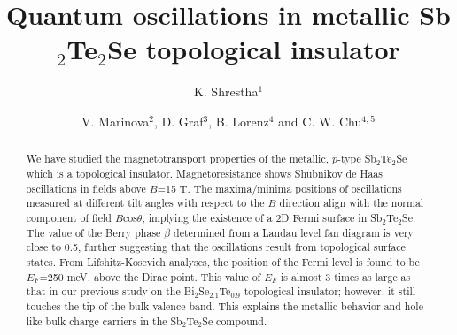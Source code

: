 \documentclass[aps,prb,twocolumn,showpacs,groupedaddress]{revtex4-1}
\begin{document}
\title[]{Quantum oscillations in metallic Sb$_2$Te$_2$Se topological insulator}
\author{K. Shrestha$^{1}$}
\author{ V. Marinova$^{2}$, D. Graf$^{3}$, B. Lorenz$^{4}$ and C. W. Chu$^{4,}$$^{5}$}


\begin{abstract}
  We have studied the magnetotransport properties of the metallic, $p$-type Sb$_2$Te$_2$Se which is a topological insulator. Magnetoresistance shows Shubnikov de Haas oscillations in  fields above $B$=15 T. The maxima/minima positions of oscillations measured at different tilt angles with respect to the $B$ direction align with the normal component of field $B$cos$\theta$, implying the existence of a 2D Fermi surface in Sb$_2$Te$_2$Se. The value of the Berry phase $\beta$ determined from a Landau level fan diagram is very close to 0.5, further suggesting that the oscillations result from topological surface states. From Lifshitz-Kosevich analyses, the position of the Fermi level is found to be $E_F$=250 meV, above the Dirac point. This value of $E_F$ is almost 3 times as large as that in our previous study on the Bi$_2$Se$_{2.1}$Te$_{0.9}$ topological insulator; however, it still touches the tip of the bulk valence band. This explains the metallic behavior and hole-like bulk charge carriers in the Sb$_2$Te$_2$Se compound.

\end{abstract}

\pacs{}

\maketitle
\end{document}
